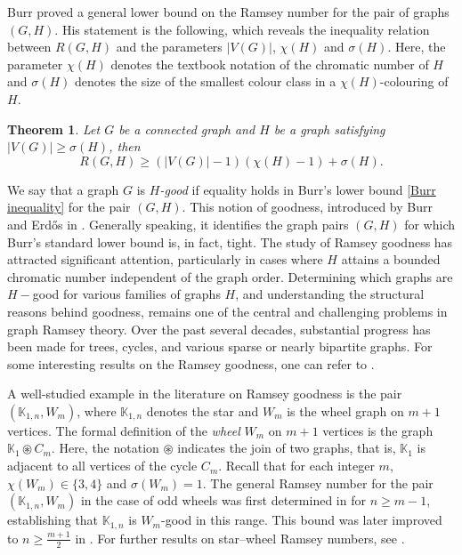 \documentclass[reqno,10pt]{amsart}
\newtheorem{theorem}{Theorem}[section]
\theoremstyle{definition}
\begin{document}
Burr proved a general lower bound on the Ramsey number for the pair of graphs $(G,H)$. His statement is the following, which reveals the inequality relation between $R(G,H)$ and the parameters $|V(G)|$, $\chi(H)$ and $\sigma(H)$. Here, the parameter $\chi(H)$ denotes the textbook notation of the chromatic number of $H$ and $\sigma(H)$ denotes the size of the smallest colour class in a $\chi(H)$-colouring of $H$.
\begin{theorem}\cite[Theorem~1]{MR635872}
Let $G$ be a connected graph and $H$ be a graph satisfying $|V(G)|\geq \sigma(H)$, then 
 \begin{equation}\label{Burr inequality}
R(G,H)\geq (|V(G)|-1)(\chi(H)-1)+\sigma(H). 
\end{equation}
\end{theorem}

\noindent We say that a graph $G$ is \emph{$H$-good} if equality holds in Burr’s lower bound \eqref{Burr inequality} for the pair $(G,H)$. This notion of goodness, introduced by Burr and Erd\H{o}s in \cite{MR693019}. Generally speaking, it identifies the graph pairs $(G,H)$ for which Burr’s standard lower bound is, in fact, tight. The study of Ramsey goodness has attracted significant attention, particularly in cases where $H$ attains a bounded chromatic number independent of the graph order. Determining which graphs are $H-$good for various families of graphs $H$, and understanding the structural reasons behind goodness, remains one of the central and challenging problems in graph Ramsey theory. Over the past several decades, substantial progress has been made for trees, cycles, and various sparse or nearly bipartite graphs. For some interesting results on the Ramsey goodness, one can refer to \cite{MR3071850,MR4624632,MR3575209,MR4142765,MR2520282}.
  
A well-studied example in the literature on Ramsey goodness is the pair $(\mathbb{K}_{1,n}, W_{m})$, where $\mathbb{K}_{1,n}$ denotes the star and $W_{m}$ is the wheel graph on $m+1$ vertices. The formal definition of the \emph{wheel} $W_{m}$ on $m+1$ vertices is the graph $\mathbb{K}_{1} \circledast C_{m}$. Here, the notation $\circledast$ indicates the join of two graphs, that is, $\mathbb{K}_{1}$ is adjacent to all vertices of the cycle $C_{m}$. Recall that for each integer $m$, $\chi(W_{m})\in\{3,4\}$ and $\sigma(W_{m})=1$. The general Ramsey number for the pair $(\mathbb{K}_{1,n}, W_{m})$ in the case of odd wheels was first determined in \cite{MR2083456} for $n \geq m-1$, establishing that $\mathbb{K}_{1,n}$ is $W_{m}$-good in this range. This bound was later improved to $n \geq \frac{m+1}{2}$ in \cite{MR2186318}. For further results on star–wheel Ramsey numbers, see \cite{MR3461979}.
\end{document}
